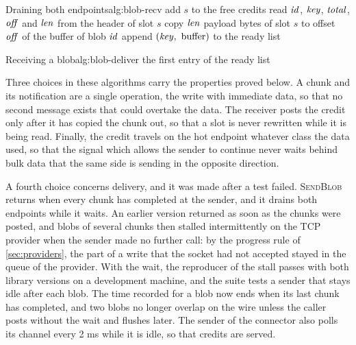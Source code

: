 \begin{pseudocode}{Draining both endpoints}{alg:blob-recv}
      \State {}
          \State add $s$ to the free credits
        \Else {}
          \State read $\mathit{id}$, $\mathit{key}$, $\mathit{total}$, $\mathit{off}$ and $\mathit{len}$ from the header of slot $s$
          \State copy $\mathit{len}$ payload bytes of slot $s$ to offset $\mathit{off}$ of the buffer of blob $\mathit{id}$
          \State {}
            \State append $(\mathit{key},\ \text{buffer})$ to the ready list
          \EndIf
        \EndIf
      \EndFor
    \EndFor
  \EndFunction
\end{pseudocode}

\begin{pseudocode}{Receiving a blob}{alg:blob-deliver}
      \State {} 
    \EndWhile
    \State \Return the first entry of the ready list
  \EndFunction
\end{pseudocode}

Three choices in these algorithms carry the properties proved below. A
chunk and its notification are a single operation, the write with immediate
data, so that no second message exists that could overtake the data. The
receiver posts the credit only after it has copied the chunk out, so that a
slot is never rewritten while it is being read. Finally, the credit travels
on the hot endpoint whatever class the data used, so that the signal which
allows the sender to continue never waits behind bulk data that the same side
is sending in the opposite direction.

A fourth choice concerns delivery, and it was made after a test failed.
\textsc{SendBlob} returns when every chunk has completed at the sender, and
it drains both endpoints while it waits. An earlier version returned as soon
as the chunks were posted, and blobs of several chunks then stalled
intermittently on the TCP provider when the sender made no further call: by
the progress rule of \cref{sec:providers}, the part of a write that the
socket had not accepted stayed in the queue of the provider. With the wait,
the reproducer of the stall passes with both library versions on a
development machine, and the suite tests a sender that stays idle after each
blob. The time recorded for a blob now ends when its last chunk has
completed, and two blobs no longer overlap on the wire unless the caller
posts without the wait and flushes later. The sender of the connector also
polls its channel every 2 ms while it is idle, so that credits are served.

